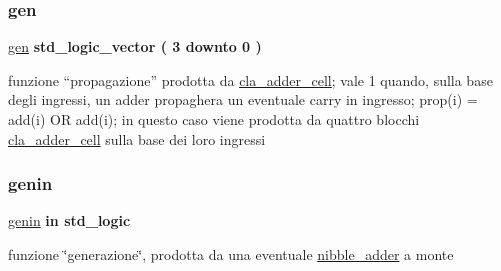 \mbox{\label{group___nibble_adder_gac6c069fe4ec1c0a42272d3de4be6f45f}} 
\subsubsection{\texorpdfstring{gen}{gen}}
{\footnotesize\ttfamily \hyperlink{group___nibble_adder_gac6c069fe4ec1c0a42272d3de4be6f45f}{gen} {\bfseries \textcolor{vhdlchar}{std\+\_\+logic\+\_\+vector}\textcolor{vhdlchar}{ }\textcolor{vhdlchar}{(}\textcolor{vhdlchar}{ }\textcolor{vhdlchar}{ } \textcolor{vhdldigit}{3} \textcolor{vhdlchar}{ }\textcolor{vhdlchar}{downto}\textcolor{vhdlchar}{ }\textcolor{vhdlchar}{ } \textcolor{vhdldigit}{0} \textcolor{vhdlchar}{ }\textcolor{vhdlchar}{)}\textcolor{vhdlchar}{ }} \hspace{0.3cm}{\ttfamily [Signal]}}

funzione “propagazione” prodotta da \hyperlink{classcla__adder__cell}{cla\+\_\+adder\+\_\+cell}; vale 1 quando, sulla base degli ingressi, un adder propaghera\textquotesingle{} un eventuale carry in ingresso; prop(i) = add(i) OR add(i); in questo caso viene prodotta da quattro blocchi \hyperlink{classcla__adder__cell}{cla\+\_\+adder\+\_\+cell} sulla base dei loro ingressi \mbox{\label{group___nibble_adder_ga0a46d5193cb73eb993bc5d4f69741d0a}} 
\subsubsection{\texorpdfstring{genin}{genin}}
{\footnotesize\ttfamily \hyperlink{group___nibble_adder_ga0a46d5193cb73eb993bc5d4f69741d0a}{genin} {\bfseries \textcolor{vhdlchar}{in}\textcolor{vhdlchar}{ }} {\bfseries \textcolor{vhdlchar}{std\+\_\+logic}\textcolor{vhdlchar}{ }} \hspace{0.3cm}{\ttfamily [Port]}}



funzione \char`\"{}generazione\char`\"{}, prodotta da una eventuale \hyperlink{classnibble__adder}{nibble\+\_\+adder} a monte 

\mbox{\label{group___nibble_adder_ga068cd5c4d23e284cb942702252ed1491}} 
